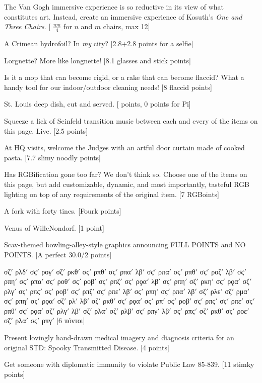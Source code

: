 \documentclass{book}
\begin{document}
\begin{list}{}{}
\newpage
\item The Van Gogh immersive experience is so reductive in its view of what constitutes art. Instead, create an immersive experience of Kosuth's \textit{One and Three Chairs}. [ $\frac{nm}{4}$ for $n$ and $m$ chairs, max 12]
\item A Crimean hydrofoil? In \textit{my} city? [2.8+2.8 points for a selfie]
\item Lorgnette? More like longnette! [8.1 glasses and stick points]
\item Is it a mop that can become rigid, or a rake that can become flaccid? What a handy tool for our indoor/outdoor cleaning needs! [8 flaccid points]
\item St. Louis deep dish, cut and served. [ points, 0 points for Pi]
\item Squeeze a lick of Seinfeld transition music between each and every of the items on this page. Live. [2.5 points]
\item At HQ visits, welcome the Judges with an artful door curtain made of cooked pasta. [7.7 slimy noodly points]
\item Has RGBification gone too far? We don't think so. Choose one of the items on this page, but add customizable, dynamic, and most importantly, tasteful RGB lighting on top of any requirements of the original item. [7 RGBoints]
\item A fork with forty tines. [Fourk points]
\item Venus of WilleNondorf. [1 point]
\item Scav-themed bowling-alley-style graphics announcing FULL POINTS and NO POINTS. [A perfect 30.0/2 points]
\item σζ$'$ ρλδ$'$ σϛ$'$ ρογ$'$ σζ$'$ ρκθ$'$ σϛ$'$ ρπθ$'$ σϛ$'$ ρπα$'$ λβ$'$ σϛ$'$ ρπα$'$ σϛ$'$ ρπθ$'$ σϛ$'$ ροζ$'$ λβ$'$ σϛ$'$ ρπη$'$ σϛ$'$ ρπα$'$ σϛ$'$ ροθ$'$ σϛ$'$ ροβ$'$ σϛ$'$ ρπζ$'$ σϛ$'$ ρϙα$'$ λβ$'$ σϛ$'$ ρπη$'$ σζ$'$ ρκη$'$ σϛ$'$ ρϙα$'$ σζ$'$ ρλγ$'$ σϛ$'$ ρπϛ$'$ σϛ$'$ ροβ$'$ σϛ$'$ ρπζ$'$ σϛ$'$ ρπε$'$ λβ$'$ σϛ$'$ ρπη$'$ σϛ$'$ ρπα$'$ λβ$'$ σζ$'$ ρλε$'$ σζ$'$ ρμα$'$ σϛ$'$ ρπη$'$ σϛ$'$ ρϙα$'$ σζ$'$ ρλ$'$ λβ$'$ σζ$'$ ρκθ$'$ σϛ$'$ ρϙα$'$ σϛ$'$ ρπ$'$ σϛ$'$ ροβ$'$ σϛ$'$ ρπϛ$'$ σϛ$'$ ρπε$'$ σϛ$'$ ρπθ$'$ σϛ$'$ ρϙα$'$ σζ$'$ ρλγ$'$ λβ$'$ σζ$'$ ρλα$'$ σζ$'$ ρλβ$'$ σϛ$'$ ρπγ$'$ λβ$'$ σϛ$'$ ρπϛ$'$ σζ$'$ ρκθ$'$ σϛ$'$ ροε$'$ σζ$'$ ρλα$'$ σϛ$'$ ρπγ$'$ [6 πόντοι]
\item Present lovingly hand-drawn medical imagery and diagnosis criteria for an original STD: Spooky Transmitted Disease. [4 points]
\item Get someone with diplomatic immunity to violate Public Law 85-839. [11 stimky points]

\end{list}
\end{document}
